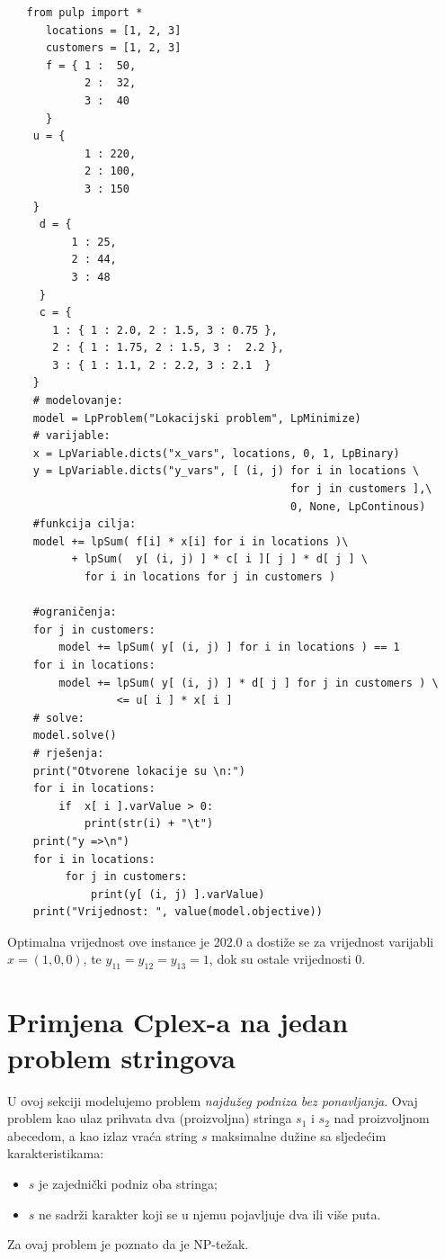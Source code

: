 \documentclass[a4paper, utf8, 11pt, colorlinks]{book}
\begin{document}
 \begin{verbatim}
   from pulp import *
 	  locations = [1, 2, 3]
 	  customers = [1, 2, 3]
 	  f = { 1 :  50,
 	        2 :  32,
 	        3 :  40 
 	  }
    u = {
            1 : 220,
            2 : 100,
            3 : 150
    }
     d = {
          1 : 25,
          2 : 44,
          3 : 48
     }
     c = {
       1 : { 1 : 2.0, 2 : 1.5, 3 : 0.75 },
       2 : { 1 : 1.75, 2 : 1.5, 3 :  2.2 },  
       3 : { 1 : 1.1, 2 : 2.2, 3 : 2.1  }
    }
    # modelovanje:
    model = LpProblem("Lokacijski problem", LpMinimize) 
    # varijable:
    x = LpVariable.dicts("x_vars", locations, 0, 1, LpBinary)
    y = LpVariable.dicts("y_vars", [ (i, j) for i in locations \ 
                                            for j in customers ],\  
                                            0, None, LpContinous)
    #funkcija cilja: 
    model += lpSum( f[i] * x[i] for i in locations )\ 
          + lpSum(  y[ (i, j) ] * c[ i ][ j ] * d[ j ] \ 
            for i in locations for j in customers )
   
    #ograničenja:
    for j in customers:
        model += lpSum( y[ (i, j) ] for i in locations ) == 1
    for i in locations: 
        model += lpSum( y[ (i, j) ] * d[ j ] for j in customers ) \ 
                 <= u[ i ] * x[ i ]
    # solve:
    model.solve()
    # rješenja:
    print("Otvorene lokacije su \n:")
    for i in locations:
        if  x[ i ].varValue > 0:
            print(str(i) + "\t")
    print("y =>\n")
    for i in locations:
         for j in customers:
             print(y[ (i, j) ].varValue)
    print("Vrijednost: ", value(model.objective))    
 \end{verbatim}
 Optimalna vrijednost ove instance je 202.0 a dostiže se za vrijednost varijabli $x = (1, 0, 0)$, te $y_{11}= y_{12}= y_{13} = 1$, dok su ostale vrijednosti 0.
 \section{Primjena Cplex-a na jedan problem stringova}
 
 U ovoj sekciji modelujemo problem \emph{najdužeg podniza bez ponavljanja}. Ovaj problem kao ulaz prihvata dva (proizvoljna) stringa $s_1$ i $s_2$ nad proizvoljnom abecedom, a kao izlaz vraća string $s$ maksimalne dužine sa sljedećim karakteristikama:  
 \begin{itemize}
 	\item $s$ je zajednički podniz oba stringa; 
 	\item $s$ ne sadrži karakter koji se u njemu pojavljuje dva ili više puta.
 \end{itemize}
Za ovaj problem je poznato da je NP-težak. 
\end{document}
